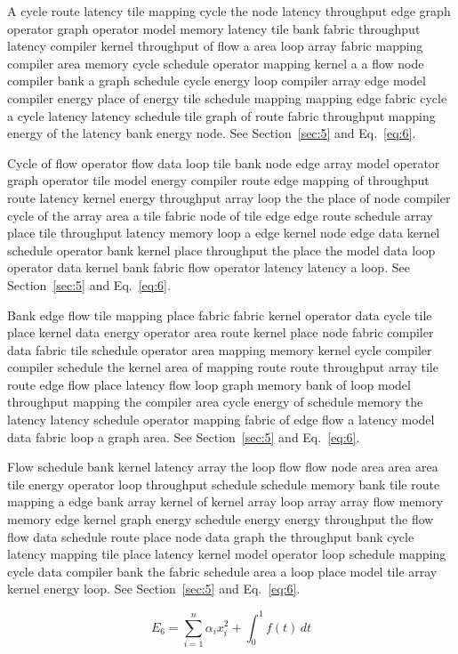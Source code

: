 \documentclass[10pt,twocolumn]{article}
\begin{document}
A cycle route latency tile mapping cycle the node latency throughput edge graph operator graph operator model memory latency tile bank fabric throughput latency compiler kernel throughput of flow a area loop array fabric mapping compiler area memory cycle schedule operator mapping kernel a a flow node compiler bank a graph schedule cycle energy loop compiler array edge model compiler energy place of energy tile schedule mapping mapping edge fabric cycle a cycle latency latency schedule tile graph of route fabric throughput mapping energy of the latency bank energy node. See Section~\ref{sec:5} and Eq.~\eqref{eq:6}.

Cycle of flow operator flow data loop tile bank node edge array model operator graph operator tile model energy compiler route edge mapping of throughput route latency kernel energy throughput array loop the the place of node compiler cycle of the array area a tile fabric node of tile edge edge route schedule array place tile throughput latency memory loop a edge kernel node edge data kernel schedule operator bank kernel place throughput the place the model data loop operator data kernel bank fabric flow operator latency latency a loop. See Section~\ref{sec:5} and Eq.~\eqref{eq:6}.

Bank edge flow tile mapping place fabric fabric kernel operator data cycle tile place kernel data energy operator area route kernel place node fabric compiler data fabric tile schedule operator area mapping memory kernel cycle compiler compiler schedule the kernel area of mapping route route throughput array tile route edge flow place latency flow loop graph memory bank of loop model throughput mapping the compiler area cycle energy of schedule memory the latency latency schedule operator mapping fabric of edge flow a latency model data fabric loop a graph area. See Section~\ref{sec:5} and Eq.~\eqref{eq:6}.

Flow schedule bank kernel latency array the loop flow flow node area area area tile energy operator loop throughput schedule schedule memory bank tile route mapping a edge bank array kernel of kernel array loop array array flow memory memory edge kernel graph energy schedule energy energy throughput the flow flow data schedule route place node data graph the throughput bank cycle latency mapping tile place latency kernel model operator loop schedule mapping cycle data compiler bank the fabric schedule area a loop place model tile array kernel energy loop. See Section~\ref{sec:5} and Eq.~\eqref{eq:6}.

\begin{equation}\label{eq:6} E_6 = \sum_{i=1}^{n} \alpha_i x_i^2 + \int_0^1 f(t)\,dt\end{equation}
\end{document}
